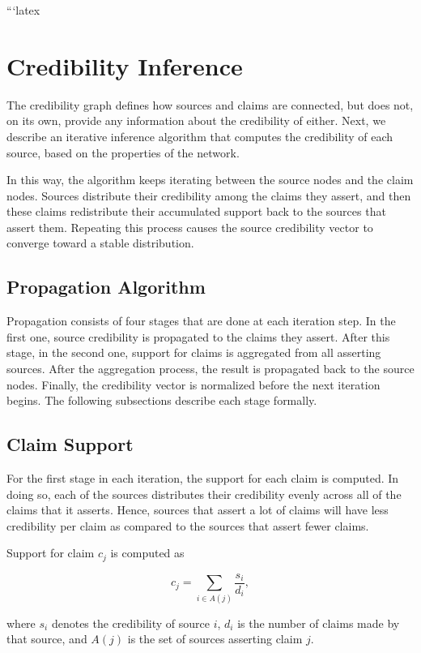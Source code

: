 ```latex
\section{Credibility Inference}

The credibility graph defines how sources and claims are connected, but does not, on its own, provide any information about the credibility of either. Next, we describe an iterative inference algorithm that computes the credibility of each source, based on the properties of the network.

In this way, the algorithm keeps iterating between the source nodes and the claim nodes. Sources distribute their credibility among the claims they assert, and then these claims redistribute their accumulated support back to the sources that assert them. Repeating this process causes the source credibility vector to converge toward a stable distribution.

\subsection{Propagation Algorithm}

Propagation consists of four stages that are done at each iteration step. In the first one, source credibility is propagated to the claims they assert. After this stage, in the second one, support for claims is aggregated from all asserting sources. After the aggregation process, the result is propagated back to the source nodes. Finally, the credibility vector is normalized before the next iteration begins. The following subsections describe each stage formally.

\subsection{Claim Support}

For the first stage in each iteration, the support for each claim is computed. In doing so, each of the sources distributes their credibility evenly across all of the claims that it asserts. Hence, sources that assert a lot of claims will have less credibility per claim as compared to the sources that assert fewer claims.

Support for claim $c_j$ is computed as

\[
c_j =
\sum_{i \in A(j)}
\frac{s_i}{d_i},
\]

where $s_i$ denotes the credibility of source $i$, $d_i$ is the number of claims made by that source, and $A(j)$ is the set of sources asserting claim $j$.

